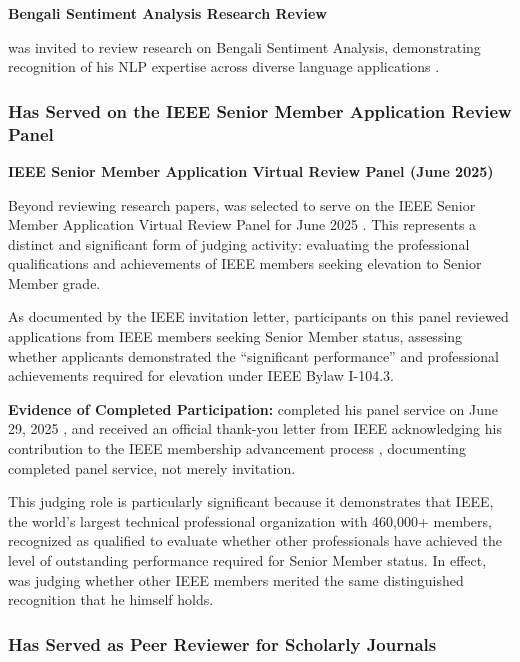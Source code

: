 \textbf{Bengali Sentiment Analysis Research Review}

\dr was invited to review research on Bengali Sentiment Analysis, demonstrating recognition of his NLP expertise across diverse language applications \cite{JR10}.


\subsubsection{\dr Has Served on the IEEE Senior Member Application Review Panel}
\label{judge:ieee}

\textbf{IEEE Senior Member Application Virtual Review Panel (June 2025)}

Beyond reviewing research papers, \dr was selected to serve on the IEEE Senior Member Application Virtual Review Panel for June 2025 \cite{JR11}. This represents a distinct and significant form of judging activity: evaluating the professional qualifications and achievements of IEEE members seeking elevation to Senior Member grade. 

As documented by the IEEE invitation letter, participants on this panel reviewed applications from IEEE members seeking Senior Member status, assessing whether applicants demonstrated the ``significant performance'' and professional achievements required for elevation under IEEE Bylaw I-104.3.

\textbf{Evidence of Completed Participation:} \dr completed his panel service on June 29, 2025 \cite{JR12}, and received an official thank-you letter from IEEE acknowledging his contribution to the IEEE membership advancement process \cite{JR13}, documenting completed panel service, not merely invitation.

This judging role is particularly significant because it demonstrates that IEEE, the world's largest technical professional organization with 460,000+ members, recognized \dr as qualified to evaluate whether other professionals have achieved the level of outstanding performance required for Senior Member status. In effect, \dr was judging whether other IEEE members merited the same distinguished recognition that he himself holds.


\subsubsection{\dr Has Served as Peer Reviewer for Scholarly Journals}
\label{judge:journals}

